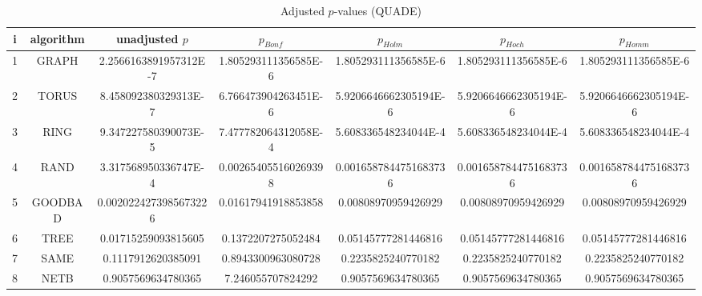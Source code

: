\documentclass[a4paper,10pt]{article}
\begin{document}
\begin{landscape}
\begin{table}[!htp]
\centering\scriptsize
\caption{Adjusted $p$-values (QUADE)}
\begin{tabular}{ccccccc}
i&algorithm&unadjusted $p$&$p_{Bonf}$&$p_{Holm}$&$p_{Hoch}$&$p_{Homm}$\\
\hline
1& GRAPH&2.2566163891957312E-7&1.805293111356585E-6&1.805293111356585E-6&1.805293111356585E-6&1.805293111356585E-6\\
2& TORUS&8.458092380329313E-7&6.766473904263451E-6&5.9206646662305194E-6&5.9206646662305194E-6&5.9206646662305194E-6\\
3& RING&9.347227580390073E-5&7.477782064312058E-4&5.608336548234044E-4&5.608336548234044E-4&5.608336548234044E-4\\
4& RAND&3.317568950336747E-4&0.002654055160269398&0.0016587844751683736&0.0016587844751683736&0.0016587844751683736\\
5& GOODBAD&0.0020224273985673226&0.01617941918853858&0.00808970959426929&0.00808970959426929&0.00808970959426929\\
6& TREE&0.01715259093815605&0.1372207275052484&0.05145777281446816&0.05145777281446816&0.05145777281446816\\
7& SAME&0.1117912620385091&0.8943300963080728&0.2235825240770182&0.2235825240770182&0.2235825240770182\\
8& NETB&0.9057569634780365&7.246055707824292&0.9057569634780365&0.9057569634780365&0.9057569634780365\\
\hline
\end{tabular}
\end{table}


\end{landscape}
\end{document}
